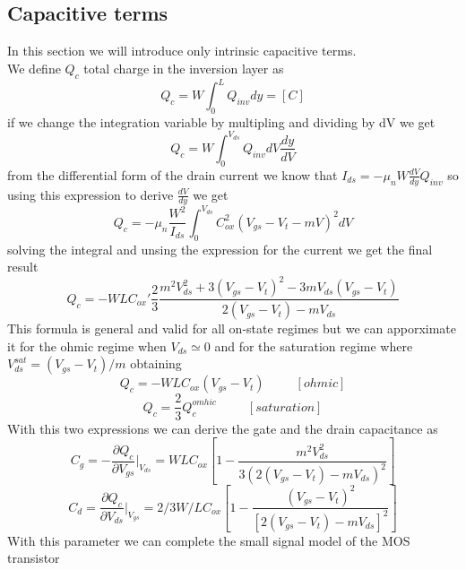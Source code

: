 \subsection{Capacitive terms}
In this section we will introduce only intrinsic capacitive terms.\\
We define $Q_c$ total charge in the inversion layer as 
\begin{equation}
Q_c=W\int^L_0Q_{inv}dy=[C]
\end{equation}
if we change the integration variable by multipling and dividing by dV we get
\begin{equation}
Q_c=W\int^{V_{ds}}_0Q_{inv}dV\frac{dy}{dV}
\end{equation}
from the differential form of the drain current we know that $I_{ds}=-\mu_nW \frac{dV}{dy}Q_{inv}$ so using this expression to derive $\frac{dV}{dy}$ we get
\begin{equation}
Q_c=-\mu_n \frac{W^2}{I_{ds}}\int^{V_{ds}}_0 C_{ox}^2(V_{gs}-V_t-mV)^2dV
\end{equation}
solving the integral and unsing the expression for the current we get the final result
\begin{equation}
Q_c=-WLC_{ox}'\frac{2}{3} \frac{m^2V_{ds}^2 + 3(V_{gs}-V_t)^2 -3mV_{ds}(V_{gs}-V_t)}{2(V_{gs}-V_t)-mV_{ds}}
\end{equation}
This formula is general and valid for all on-state regimes but we can apporximate it for the ohmic regime when $V_{ds}\simeq 0$ and for the saturation regime where $V_{ds}^{sat}=(V_{gs}-V_t)/m$ obtaining
\begin{equation}
Q_c=-WLC_{ox}(V_{gs}-V_t)   \ \ \ \ \ \ \ \ \ \ \ [ohmic]
\end{equation}
\begin{equation}
Q_c=\frac{2}{3}  Q_c^{omhic} \ \ \ \ \ \ \ \ \ \ \ [saturation]
\end{equation}
With this two expressions we can derive the gate and the drain capacitance as
\begin{equation}
C_g=-\frac{\partial Q_c}{\partial V_{gs}}|_{V_{ds}}=WLC_{ox}[1-\frac{m^2V_{ds}^2}{3(2(V_{gs}-V_t)-mV_{ds})^2}]
\end{equation}
\begin{equation}
C_d=\frac{\partial Q_c}{\partial V_{ds}}|_{V_{gs}}=2/3W/LC_{ox}[1-\frac{(V_{gs}-V_{t})^2}{[2(V_{gs}-V_t)-mV_{ds}]^2}]
\end{equation}
With this parameter we can complete the small signal model of the MOS transistor\\

